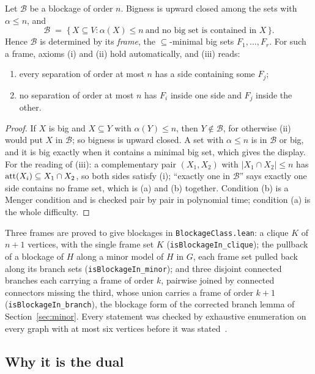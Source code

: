 \begin{lemma}\label{lem:frame}
Let $\mathcal B$ be a blockage of order $n$. Bigness is upward closed among
the sets with $\alpha\le n$, and
\[
\mathcal B \;=\; \{\,X\subseteq V : \alpha(X)\le n\ \text{and no big set is contained in } X\,\}.
\]
Hence $\mathcal B$ is determined by its \emph{frame}, the $\subseteq$-minimal
big sets $F_1,\dots,F_r$. For such a frame, axioms (i) and (ii) hold
automatically, and (iii) reads:
\begin{enumerate}
\item[(a)] every separation of order at most $n$ has a side containing some $F_j$;
\item[(b)] no separation of order at most $n$ has $F_i$ inside one side and $F_j$ inside the other.
\end{enumerate}
\end{lemma}
\begin{proof}
If $X$ is big and $X\subseteq Y$ with $\alpha(Y)\le n$, then $Y\notin\mathcal B$,
for otherwise (ii) would put $X$ in $\mathcal B$; so bigness is upward
closed. A set with $\alpha\le n$ is in $\mathcal B$ or big, and it is big
exactly when it contains a minimal big set, which gives the display. For the
reading of (iii): a complementary pair $(X_1,X_2)$ with $|X_1\cap X_2|\le n$
has $\operatorname{att}(X_i)\subseteq X_1\cap X_2$, so both sides satisfy (i); ``exactly
one in $\mathcal B$'' says exactly one side contains no frame set, which is
(a) and (b) together. Condition (b) is a Menger condition and is checked
pair by pair in polynomial time; condition (a) is the whole difficulty.
\end{proof}

Three frames are proved to give blockages in \texttt{BlockageClass.lean}: a
clique $K$ of $n+1$ vertices, with the single frame set $K$
(\texttt{isBlockageIn\_clique}); the pullback of a blockage of $H$ along a
minor model of $H$ in $G$, each frame set pulled back along its branch sets
(\texttt{isBlockageIn\_minor}); and three disjoint connected branches each
carrying a frame of order $k$, pairwise joined by connected connectors
missing the third, whose union carries a frame of order $k+1$
(\texttt{isBlockageIn\_branch}), the blockage form of the corrected branch
lemma of Section~\ref{sec:minor}. Every statement was checked by exhaustive
enumeration on every graph with at most six vertices before it was
stated~.

\subsection{Why it is the dual}

